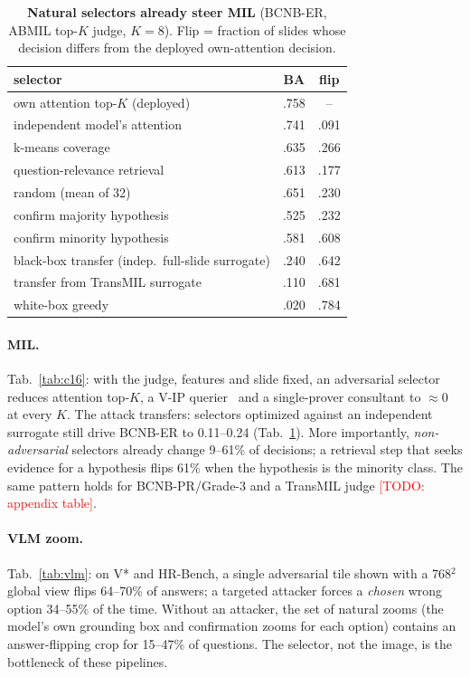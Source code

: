 \documentclass[10pt,twocolumn,letterpaper]{article}
\newcommand{\todo}[1]{\textcolor{red}{[TODO: #1]}}
\begin{document}
\begin{table}[t]\centering\small
\caption{\textbf{Natural selectors already steer MIL} (BCNB-ER, ABMIL top-$K$ judge, $K{=}8$). Flip = fraction of slides whose decision differs from the deployed own-attention decision.}\label{tab:natural}
\begin{tabular}{@{}lcc@{}}\toprule
selector & BA & flip\\\midrule
own attention top-$K$ (deployed) & .758 & --\\
independent model's attention & .741 & .091\\
k-means coverage & .635 & .266\\
question-relevance retrieval & .613 & .177\\
random (mean of 32) & .651 & .230\\
confirm majority hypothesis & .525 & .232\\
confirm minority hypothesis & .581 & .608\\\midrule
black-box transfer (indep.\ full-slide surrogate) & .240 & .642\\
transfer from TransMIL surrogate & .110 & .681\\
white-box greedy & .020 & .784\\\bottomrule
\end{tabular}\end{table}

\paragraph{MIL.} Tab.~\ref{tab:c16}: with the judge, features and slide fixed, an adversarial selector reduces attention top-$K$, a V-IP querier~\cite{chattopadhyay2023vip} and a single-prover consultant to $\approx$0 at every $K$. The attack transfers: selectors optimized against an independent surrogate still drive BCNB-ER to 0.11--0.24 (Tab.~\ref{tab:natural}). More importantly, \emph{non-adversarial} selectors already change 9--61\% of decisions; a retrieval step that seeks evidence for a hypothesis flips 61\% when the hypothesis is the minority class. The same pattern holds for BCNB-PR/Grade-3 and a TransMIL judge \todo{appendix table}.

\paragraph{VLM zoom.} Tab.~\ref{tab:vlm}: on V* and HR-Bench, a single adversarial tile shown with a 768$^2$ global view flips 64--70\% of answers; a targeted attacker forces a \emph{chosen} wrong option 34--55\% of the time. Without an attacker, the set of natural zooms (the model's own grounding box and confirmation zooms for each option) contains an answer-flipping crop for 15--47\% of questions. The selector, not the image, is the bottleneck of these pipelines.
\end{document}
